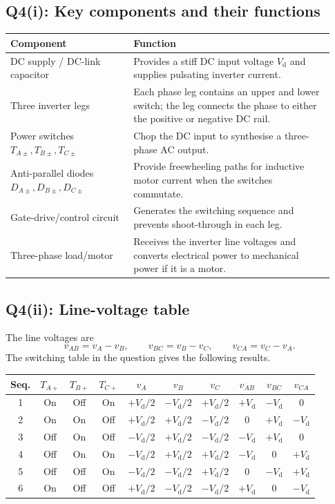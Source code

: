 \documentclass[11pt,a4paper]{article}
\newcommand{\Vd}{V_{\mathrm d}}
\begin{document}
\subsection*{Q4(i): Key components and their functions}

\begin{center}
\begin{tabular}{@{}p{0.35\linewidth}p{0.58\linewidth}@{}}
\toprule
Component & Function \\
\midrule
DC supply / DC-link capacitor & Provides a stiff DC input voltage $\Vd$ and supplies pulsating inverter current. \\
Three inverter legs & Each phase leg contains an upper and lower switch; the leg connects the phase to either the positive or negative DC rail. \\
Power switches $T_{A\pm},T_{B\pm},T_{C\pm}$ & Chop the DC input to synthesise a three-phase AC output. \\
Anti-parallel diodes $D_{A\pm},D_{B\pm},D_{C\pm}$ & Provide freewheeling paths for inductive motor current when the switches commutate. \\
Gate-drive/control circuit & Generates the switching sequence and prevents shoot-through in each leg. \\
Three-phase load/motor & Receives the inverter line voltages and converts electrical power to mechanical power if it is a motor. \\
\bottomrule
\end{tabular}
\end{center}

\subsection*{Q4(ii): Line-voltage table}

The line voltages are
\[
v_{AB}=v_A-v_B,
\qquad
v_{BC}=v_B-v_C,
\qquad
v_{CA}=v_C-v_A.
\]
The switching table in the question gives the following results.

\begin{center}
\begin{tabular}{@{}c c c c c c c c c c@{}}
\toprule
Seq. & $T_{A+}$ & $T_{B+}$ & $T_{C+}$ & $v_A$ & $v_B$ & $v_C$ & $v_{AB}$ & $v_{BC}$ & $v_{CA}$ \\
\midrule
1 & On  & Off & On  & $+\Vd/2$ & $-\Vd/2$ & $+\Vd/2$ & $+\Vd$ & $-\Vd$ & $0$ \\
2 & On  & On  & Off & $+\Vd/2$ & $+\Vd/2$ & $-\Vd/2$ & $0$ & $+\Vd$ & $-\Vd$ \\
3 & Off & On  & Off & $-\Vd/2$ & $+\Vd/2$ & $-\Vd/2$ & $-\Vd$ & $+\Vd$ & $0$ \\
4 & Off & On  & On  & $-\Vd/2$ & $+\Vd/2$ & $+\Vd/2$ & $-\Vd$ & $0$ & $+\Vd$ \\
5 & Off & Off & On  & $-\Vd/2$ & $-\Vd/2$ & $+\Vd/2$ & $0$ & $-\Vd$ & $+\Vd$ \\
6 & On  & Off & Off & $+\Vd/2$ & $-\Vd/2$ & $-\Vd/2$ & $+\Vd$ & $0$ & $-\Vd$ \\
\bottomrule
\end{tabular}
\end{center}
\end{document}

